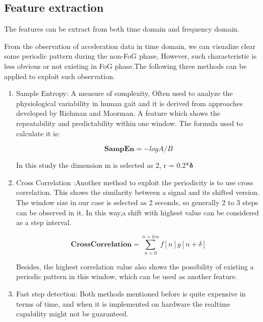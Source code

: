 \documentclass[article]{article}
\begin{document}
	

    


\subsection{Feature extraction}


	The features can be extract from both time domain and frequency domain. 
	
	From the observation of acceleration data in time domain, we can visualize clear some periodic pattern during the non-FoG phase, However, such characteristic is less obvious or not existing in FoG phase.The following three methods can be applied to exploit such observation.

	\begin{enumerate}
		\item Sample Entropy: A measure of complexity, Often used to analyze the physiological variability in human gait and it is derived from approaches developed by Richman and Moorman. A feature which shows the repeatability and predictability within one window. The formula used to calculate it is:
    
		    \begin{equation}
		        \mathbf{SampEn} = -log A/B
		    \end{equation}
   
		   In this study the dimension m is selected as 2, r = 0.2*$\mathbf{\delta}$ 
  
		
	\item Cross Correlation :Another method to exploit the periodicity is to use cross correlation. This shows the similarity between a signal and its shifted version. The window size in our case is selected as 2 seconds, so generally 2 to 3 steps can be observed in it. In this way,a shift with highest value can be considered as a step interval.
		
		\begin{equation}
		\mathbf{CrossCorrelation} = \sum_{n=0}^{n=len} f[n]g[n+\delta]
		\end{equation}
		
		Besides, the highest correlation value also shows the possibility of existing a periodic pattern in this window, which can be used as another feature.
		
		


	\item Fast step detection: Both methods mentioned before is quite expensive in terms of time, and when it is implemented on hardware the realtime capability might not be guaranteed. 
		

\end{enumerate}
\end{document}
